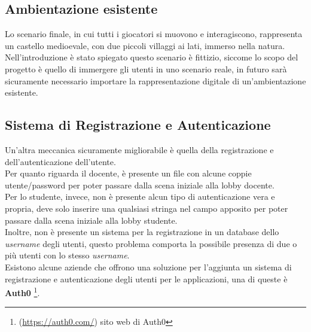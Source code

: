 \subsection{Ambientazione esistente}
Lo scenario finale, in cui tutti i giocatori si muovono e interagiscono, rappresenta un castello medioevale, con due piccoli villaggi ai lati, immerso nella natura.
\\Nell'introduzione è stato spiegato questo scenario è fittizio, siccome lo scopo del progetto è quello di immergere gli utenti in uno scenario reale, in futuro sarà sicuramente necessario importare la rappresentazione digitale di un'ambientazione esistente.
\subsection{Sistema di Registrazione e Autenticazione}
Un'altra meccanica sicuramente migliorabile è quella della registrazione e dell'autenticazione dell'utente.
\\Per quanto riguarda il docente, è presente un file con alcune coppie utente/password per poter passare dalla scena iniziale alla lobby docente.
\\Per lo studente, invece, non è presente alcun tipo di autenticazione vera e propria, deve solo inserire una qualsiasi stringa nel campo apposito per poter passare dalla scena iniziale alla lobby studente.
\\Inoltre, non è presente un sistema per la registrazione in un database dello \textit{username} degli utenti, questo problema comporta la possibile presenza di due o più utenti con lo stesso \textit{username}.
\\Esistono alcune aziende che offrono una soluzione per l'aggiunta un sistema di registrazione e autenticazione degli utenti per le applicazioni, una di queste è \textbf{Auth0} \footnote{(\url{https://auth0.com/}) sito web di Auth0}.